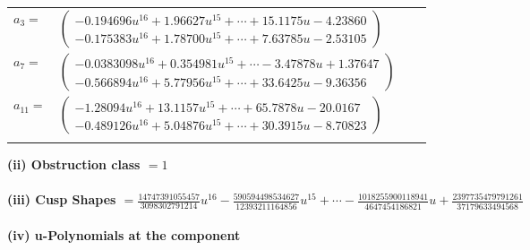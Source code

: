 \documentclass[1p]{elsarticle_modified}
\theoremstyle{definition}
\begin{document}
\begin{tabular}{m{7pt} m{180pt} m{7pt} m{180pt} }
\flushright $a_{3}=$&$\begin{pmatrix}-0.194696 u^{16}+1.96627 u^{15}+\cdots+15.1175 u-4.23860\\-0.175383 u^{16}+1.78700 u^{15}+\cdots+7.63785 u-2.53105\end{pmatrix}$ \\
\flushright $a_{7}=$&$\begin{pmatrix}-0.0383098 u^{16}+0.354981 u^{15}+\cdots-3.47878 u+1.37647\\-0.566894 u^{16}+5.77956 u^{15}+\cdots+33.6425 u-9.36356\end{pmatrix}$ \\
\flushright $a_{11}=$&$\begin{pmatrix}-1.28094 u^{16}+13.1157 u^{15}+\cdots+65.7878 u-20.0167\\-0.489126 u^{16}+5.04876 u^{15}+\cdots+30.3915 u-8.70823\end{pmatrix}$\\&\end{tabular}
\flushleft \textbf{(ii) Obstruction class $= 1$}\\~\\
\flushleft \textbf{(iii) Cusp Shapes $= \frac{14747391055457}{3098302791214} u^{16}-\frac{590594498534627}{12393211164856} u^{15}+\cdots-\frac{1018255900118941}{4647454186821} u+\frac{2397735479791261}{37179633494568}$}\\~\\
\newpage\renewcommand{\arraystretch}{1}
\flushleft \textbf{(iv) u-Polynomials at the component}\newline \\
\end{document}
